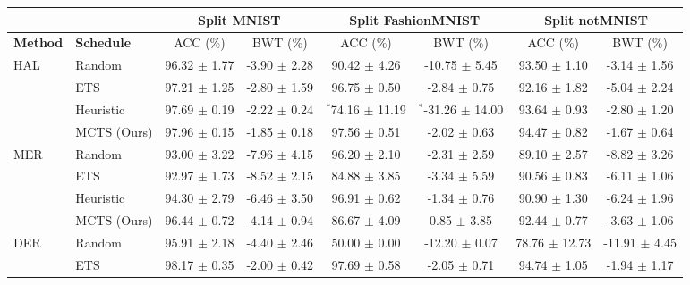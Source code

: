 
\begin{tabular}{llcccccc}
	\toprule
	\textbf{}              & \textbf{}         & \multicolumn{2}{c}{\textbf{Split MNIST}} & \multicolumn{2}{c}{\textbf{Split FashionMNIST}} & \multicolumn{2}{c}{\textbf{Split notMNIST}} \\ \midrule
	\textbf{Method}        & \textbf{Schedule} & ACC (\%)           & BWT (\%)            & ACC (\%)               & BWT (\%)               & ACC (\%)             & BWT (\%)             \\ \midrule
	\multirow{4}{*}{HAL}   & Random            & 96.32 $\pm$ 1.77     & -3.90 $\pm$ 2.28      & 90.42 $\pm$ 4.26         & -10.75 $\pm$ 5.45        & 93.50 $\pm$ 1.10       & -3.14 $\pm$ 1.56       \\
	& ETS               & 97.21 $\pm$ 1.25     & -2.80 $\pm$ 1.59      & 96.75 $\pm$ 0.50         & -2.84 $\pm$ 0.75         & 92.16 $\pm$ 1.82       & -5.04 $\pm$ 2.24       \\
	& Heuristic           & 97.69 $\pm$ 0.19     & -2.22 $\pm$ 0.24      & $^{*}$74.16 $\pm$ 11.19        & $^{*}$-31.26 $\pm$ 14.00       & 93.64 $\pm$ 0.93       & -2.80 $\pm$ 1.20       \\
	& MCTS (Ours)              & 97.96 $\pm$ 0.15     & -1.85 $\pm$ 0.18      & 97.56 $\pm$ 0.51         & -2.02 $\pm$ 0.63         & 94.47 $\pm$ 0.82       & -1.67 $\pm$ 0.64       \\ \midrule
	\multirow{4}{*}{MER}   & Random            & 93.00 $\pm$ 3.22     & -7.96 $\pm$ 4.15      & 96.20 $\pm$ 2.10         & -2.31 $\pm$ 2.59         & 89.10 $\pm$ 2.57       & -8.82 $\pm$ 3.26       \\
	& ETS               & 92.97 $\pm$ 1.73     & -8.52 $\pm$ 2.15      & 84.88 $\pm$ 3.85         & -3.34 $\pm$ 5.59         & 90.56 $\pm$ 0.83       & -6.11 $\pm$ 1.06       \\
	& Heuristic           & 94.30 $\pm$ 2.79     & -6.46 $\pm$ 3.50      & 96.91 $\pm$ 0.62         & -1.34 $\pm$ 0.76         & 90.90 $\pm$ 1.30       & -6.24 $\pm$ 1.96       \\
	& MCTS (Ours)              & 96.44 $\pm$ 0.72     & -4.14 $\pm$ 0.94      & 86.67 $\pm$ 4.09         & 0.85 $\pm$ 3.85          & 92.44 $\pm$ 0.77       & -3.63 $\pm$ 1.06       \\ \midrule
	\multirow{4}{*}{DER}   & Random            & 95.91 $\pm$ 2.18     & -4.40 $\pm$ 2.46      & 50.00 $\pm$ 0.00         & -12.20 $\pm$ 0.07        & 78.76 $\pm$ 12.73      & -11.91 $\pm$ 4.45      \\
	& ETS               & 98.17 $\pm$ 0.35     & -2.00 $\pm$ 0.42      & 97.69 $\pm$ 0.58         & -2.05 $\pm$ 0.71         & 94.74 $\pm$ 1.05       & -1.94 $\pm$ 1.17       \\

\end{tabular}
